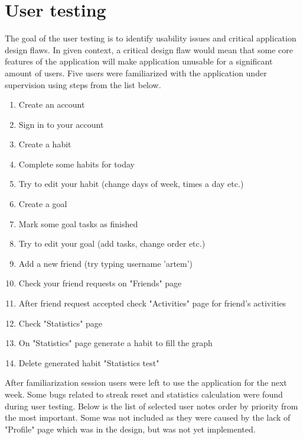 
\section{User testing}\label{sec:user-testing}

The goal of the user testing is to identify usability issues and critical application design flaws.
In given context, a critical design flaw would mean that some core features of the application
will make application unusable for a significant amount of users.
Five users were familiarized with the application under supervision using steps from the list below.

\begin{enumerate}
    \item Create an account
    \item Sign in to your account
    \item Create a habit
    \item Complete some habits for today
    \item Try to edit your habit (change days of week, times a day etc.)
    \item Create a goal
    \item Mark some goal tasks as finished
    \item Try to edit your goal (add tasks, change order etc.)
    \item Add a new friend (try typing username 'artem')
    \item Check your friend requests on "Friends" page
    \item After friend request accepted check "Activities" page for friend's activities
    \item Check "Statistics" page
    \item On "Statistics" page generate a habit to fill the graph
    \item Delete generated habit "Statistics test"
\end{enumerate}

After familiarization session users were left to use the application for the next week.
Some bugs related to streak reset and statistics calculation were found during user testing.
Below is the list of selected user notes order by priority from the most important.
Some was not included as they were caused by the lack of "Profile" page which was in the design, but was not yet implemented.

